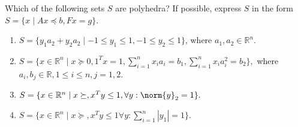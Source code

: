 \documentclass{ctexart}
\begin{document}
\begin{problem}\label{pro:2.8}
  Which of the following sets \(S \) are polyhedra? If possible,
  express \(S \) in the form \(S=\{x \mid Ax \preceq b, Fx=g \}. \)
  \begin{enumerate}
    \item \(S=\{y_1a_2 + y_2 a_2 \mid -1 \leq y_1 \leq 1, -1 \leq y_2 \leq 1\} \), where \(a_1,a_2 \in \mathbb{R}^n \).
    \item \(S=\{x \in \mathbb{R}^n \mid x \succeq 0, \mathrm{1}^T x =1, \sum_{i=1}^{n}x_ia_i =b_1,\sum_{i=1}^{n}x_i a_i^2 =b_2\}, \) where \(a_i , b_j\in \mathbb{R}, 1 \leq i \leq n, j=1,2\).
    \item \(S=\{x \in \mathbb{R}^n \mid x \succeq, x^Ty \leq 1, \forall y:\norm{y}_2 =1\}. \)
    \item \(S=\{x \in \mathbb{R}^n \mid x \succeq, x^Ty \leq 1 \forall y:\sum_{i=1}^{n} |y_1|=1\}. \)
  \end{enumerate}
\end{problem}
\end{document}

